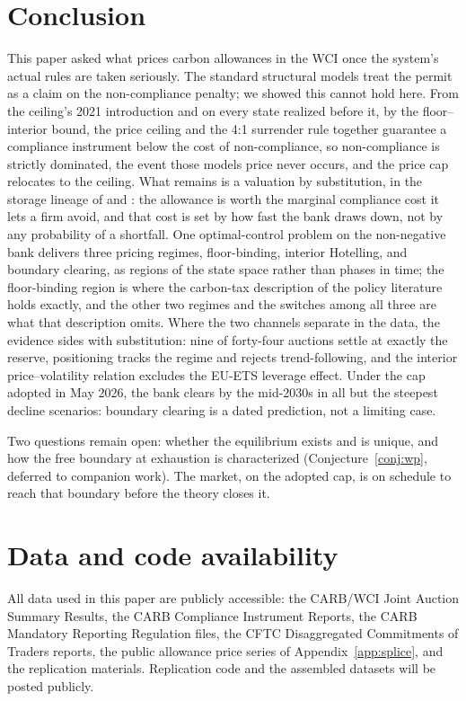 \documentclass[11pt,letterpaper]{article}
\theoremstyle{plain}
\theoremstyle{definition}
\numberwithin{equation}{section}
\begin{document}
\section{Conclusion}\label{sec:conclusion}
This paper asked what prices carbon allowances in the WCI once the system's actual rules are taken seriously. The standard structural models treat the permit as a claim on the non-compliance penalty; we showed this cannot hold here. From the ceiling's 2021 introduction and on every state realized before it, by the floor--interior bound, the price ceiling and the 4:1 surrender rule together guarantee a compliance instrument below the cost of non-compliance, so non-compliance is strictly dominated, the event those models price never occurs, and the price cap relocates to the ceiling. What remains is a valuation by substitution, in the storage lineage of \citet{schennach2000} and \citet{salant2022}: the allowance is worth the marginal compliance cost it lets a firm avoid, and that cost is set by how fast the bank draws down, not by any probability of a shortfall. One optimal-control problem on the non-negative bank delivers three pricing regimes, floor-binding, interior Hotelling, and boundary clearing, as regions of the state space rather than phases in time; the floor-binding region is where the carbon-tax description of the policy literature holds exactly, and the other two regimes and the switches among all three are what that description omits. Where the two channels separate in the data, the evidence sides with substitution: nine of forty-four auctions settle at exactly the reserve, positioning tracks the regime and rejects trend-following, and the interior price--volatility relation excludes the EU-ETS leverage effect. Under the cap adopted in May 2026, the bank clears by the mid-2030s in all but the steepest decline scenarios: boundary clearing is a dated prediction, not a limiting case.

Two questions remain open: whether the equilibrium exists and is unique, and how the free boundary at exhaustion is characterized (Conjecture~\ref{conj:wp}, deferred to companion work). The market, on the adopted cap, is on schedule to reach that boundary before the theory closes it.

\section*{Data and code availability}
All data used in this paper are publicly accessible: the CARB/WCI Joint Auction Summary Results, the CARB Compliance Instrument Reports, the CARB Mandatory Reporting Regulation files, the CFTC Disaggregated Commitments of Traders reports, the public allowance price series of Appendix~\ref{app:splice}, and the \citet{borenstein2019} replication materials. Replication code and the assembled datasets will be posted publicly.
\appendix
\end{document}
